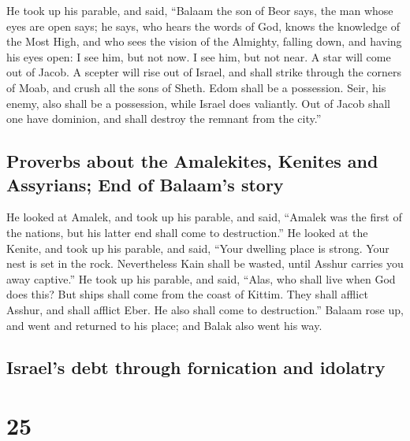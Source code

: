  He took up his parable, and said, ``Balaam the son of
Beor says, the man whose eyes are open says;  he says,
who hears the words of God, knows the knowledge of the Most High, and
who sees the vision of the Almighty, falling down, and having his eyes
open:  I see him, but not now. I see him, but not near. A
star will come out of Jacob. A scepter will rise out of Israel, and
shall strike through the corners of Moab, and crush all the sons of
Sheth.  Edom shall be a possession. Seir, his enemy, also
shall be a possession, while Israel does valiantly.  Out
of Jacob shall one have dominion, and shall destroy the remnant from the
city.''

\hypertarget{proverbs-about-the-amalekites-kenites-and-assyrians-end-of-balaams-story}{%
\subsection{Proverbs about the Amalekites, Kenites and Assyrians; End of
Balaam's
story}\label{proverbs-about-the-amalekites-kenites-and-assyrians-end-of-balaams-story}}

 He looked at Amalek, and took up his parable, and said,
``Amalek was the first of the nations, but his latter end shall come to
destruction.''  He looked at the Kenite, and took up his
parable, and said, ``Your dwelling place is strong. Your nest is set in
the rock.  Nevertheless Kain shall be wasted, until
Asshur carries you away captive.''  He took up his
parable, and said, ``Alas, who shall live when God does this?
 But ships shall come from the coast of Kittim. They
shall afflict Asshur, and shall afflict Eber. He also shall come to
destruction.''  Balaam rose up, and went and returned to
his place; and Balak also went his way.

\hypertarget{israels-debt-through-fornication-and-idolatry}{%
\subsection{Israel's debt through fornication and
idolatry}\label{israels-debt-through-fornication-and-idolatry}}

\hypertarget{section-24}{%
\section{25}\label{section-24}}

